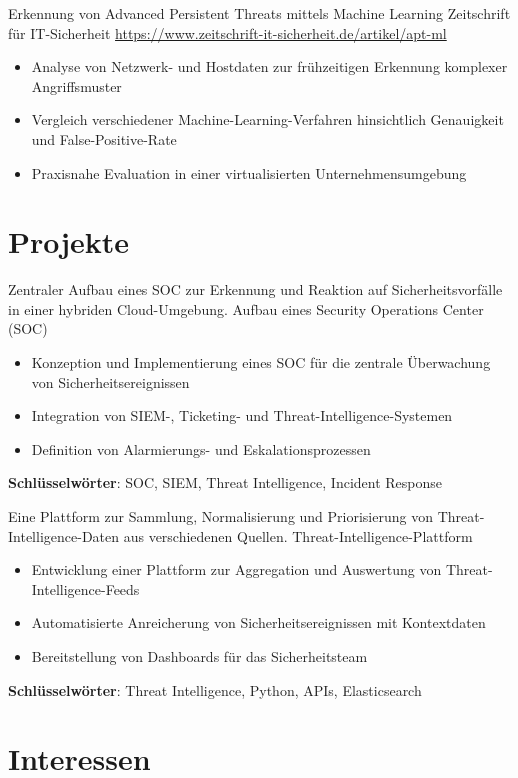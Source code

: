 \documentclass[a4paper, serif, 10pt]{moderncv}
\begin{document}
        {Erkennung von Advanced Persistent Threats mittels Machine Learning}
        {Zeitschrift für IT-Sicherheit}
        {\url{https://www.zeitschrift-it-sicherheit.de/artikel/apt-ml}}
        {}
        {\begin{itemize}
\item Analyse von Netzwerk- und Hostdaten zur frühzeitigen Erkennung komplexer Angriffsmuster
\item Vergleich verschiedener Machine-Learning-Verfahren hinsichtlich Genauigkeit und False-Positive-Rate
\item Praxisnahe Evaluation in einer virtualisierten Unternehmensumgebung
\end{itemize}}
\section{Projekte}

        {Zentraler Aufbau eines SOC zur Erkennung und Reaktion auf Sicherheitsvorfälle in einer hybriden Cloud-Umgebung.}
        {Aufbau eines Security Operations Center (SOC)}
        {}
        {}
        {\begin{itemize}
\item Konzeption und Implementierung eines SOC für die zentrale Überwachung von Sicherheitsereignissen
\item Integration von SIEM-, Ticketing- und Threat-Intelligence-Systemen
\item Definition von Alarmierungs- und Eskalationsprozessen
\end{itemize}
\textbf{Schlüsselwörter}: SOC, SIEM, Threat Intelligence, Incident Response}

        {Eine Plattform zur Sammlung, Normalisierung und Priorisierung von Threat-Intelligence-Daten aus verschiedenen Quellen.}
        {Threat-Intelligence-Plattform}
        {}
        {}
        {\begin{itemize}
\item Entwicklung einer Plattform zur Aggregation und Auswertung von Threat-Intelligence-Feeds
\item Automatisierte Anreicherung von Sicherheitsereignissen mit Kontextdaten
\item Bereitstellung von Dashboards für das Sicherheitsteam
\end{itemize}
\textbf{Schlüsselwörter}: Threat Intelligence, Python, APIs, Elasticsearch}
\section{Interessen}
\end{document}
